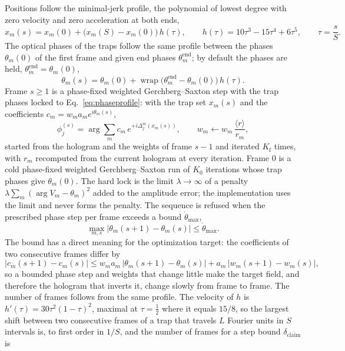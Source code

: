 Positions follow the minimal-jerk profile, the polynomial of lowest degree with zero velocity and zero acceleration at both ends,
\begin{equation}
x_m(s)=x_m(0)+\big(x_m(S)-x_m(0)\big)\,h(\tau),\qquad h(\tau)=10\tau^3-15\tau^4+6\tau^5,\qquad \tau=\frac sS.\label{eq:minjerk}
\end{equation}
The optical phases of the traps follow the same profile between the phases $\theta_m(0)$ of the first frame and given end phases $\theta_m^{\mathrm{end}}$; by default the phases are held, $\theta_m^{\mathrm{end}}=\theta_m(0)$,
\begin{equation}
\theta_m(s)=\theta_m(0)+\operatorname{wrap}\big(\theta_m^{\mathrm{end}}-\theta_m(0)\big)\,h(\tau).\label{eq:phaseprofile}
\end{equation}
Frame $s\ge1$ is a phase-fixed weighted Gerchberg--Saxton step with the trap phases locked to Eq.~\ref{eq:phaseprofile}: with the trap set $x_m(s)$ and the coefficients $c_m=w_ma_me^{i\theta_m(s)}$,
\begin{equation}
\phi_j^{(s)}=\arg\sum_mc_m\,e^{+i\Delta_j^m(x_m(s))},\qquad w_m\leftarrow w_m\,\frac{\langle r\rangle}{r_m},\label{eq:frame}
\end{equation}
started from the hologram and the weights of frame $s-1$ and iterated $K_{\mathrm f}$ times, with $r_m$ recomputed from the current hologram at every iteration. Frame 0 is a cold phase-fixed weighted Gerchberg--Saxton run of $K_0$ iterations whose trap phases give $\theta_m(0)$. The hard lock is the limit $\lambda\to\infty$ of a penalty $\lambda\sum_m(\arg V_m-\theta_m)^2$ added to the amplitude error; the implementation uses the limit and never forms the penalty. The sequence is refused when the prescribed phase step per frame exceeds a bound $\dot\theta_{\max}$,
\begin{equation}
\max_{m,s}\big|\theta_m(s+1)-\theta_m(s)\big|\le\dot\theta_{\max}.\label{eq:phasebound}
\end{equation}
The bound has a direct meaning for the optimization target: the coefficients of two consecutive frames differ by
\begin{equation}
\big|c_m(s+1)-c_m(s)\big|\le w_ma_m\,\big|\theta_m(s+1)-\theta_m(s)\big|+a_m\,\big|w_m(s+1)-w_m(s)\big|,\label{eq:targetstep}
\end{equation}
so a bounded phase step and weights that change little make the target field, and therefore the hologram that inverts it, change slowly from frame to frame. The number of frames follows from the same profile. The velocity of $h$ is $h'(\tau)=30\tau^2(1-\tau)^2$, maximal at $\tau=\tfrac12$ where it equals $15/8$, so the largest shift between two consecutive frames of a trap that travels $L$ Fourier units in $S$ intervals is, to first order in $1/S$, and the number of frames for a step bound $\delta_{\mathrm{claim}}$ is
